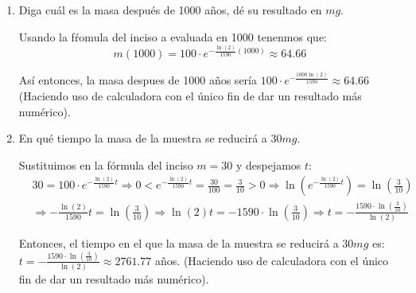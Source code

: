 \documentclass[12pt]{article}
\begin{document}
\begin{enumerate}[\hspace{9px} a)]
        As\'i entonces nuestra f\'ormula para calcular la masa restante en funci\'on del tiempo es (Con t en años y m en mg):
        \[m(t)=100\cdot e^{-\frac{\ln(2)}{1590}t}\]

    \item Diga cuál es la masa después de 1000 años, dé su resultado en $mg$.\medskip
    
        Usando la f\'romula del inciso a evaluada en 1000 tenenmos que:
        \[m(1000)=100\cdot e^{-\frac{\ln(2)}{1590}(1000)}\approx64.66\]

        As\'i entonces, la masa despues de 1000 años ser\'ia \(100\cdot e^{-\frac{1000\ln(2)}{1590}}\approx64.66\) (Haciendo uso de calculadora con el \'unico fin de dar un resultado m\'as num\'erico).\medskip

    \item En qué tiempo la masa de la muestra se reducirá a $30mg$.\medskip
    
        Sustituimos en la f\'ormula del inciso \(m=30\) y despejamos $t$:
        \begin{align*}
            &30=100\cdot e^{-\frac{\ln(2)}{1590}t} \Longrightarrow 0<e^{-\frac{\ln(2)}{1590}t}=\frac{30}{100}=\frac{3}{10}>0\Longrightarrow \ln\left(e^{-\frac{\ln(2)}{1590}t}\right)=\ln\left(\frac{3}{10}\right)\\
            &\Longrightarrow -\frac{\ln(2)}{1590}t = \ln\left(\frac{3}{10}\right) \Longrightarrow \ln(2)t = -1590\cdot\ln\left(\frac{3}{10}\right) \Longrightarrow t = -\frac{1590\cdot\ln\left(\frac{3}{10}\right)}{\ln(2)}
        \end{align*}

        Entonces, el tiempo en el que la masa de la muestra se reducir\'a a \(30mg\) es:\quad \(t = -\frac{1590\cdot\ln\left(\frac{3}{10}\right)}{\ln(2)}\approx2761.77\) años. (Haciendo uso de calculadora con el \'unico fin de dar un resultado m\'as num\'erico).\medskip

\end{enumerate}
\end{document}
